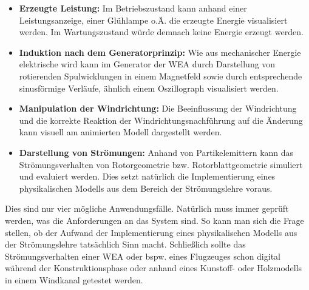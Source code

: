 \begin{itemize}
\item \textbf{Erzeugte Leistung:} Im Betriebszustand kann anhand einer Leistungsanzeige, einer Glühlampe o.Ä. die erzeugte Energie visualisiert werden. Im Wartungszustand würde demnach keine Energie erzeugt werden.
 
\item \textbf{Induktion nach dem Generatorprinzip:} Wie aus mechanischer Energie elektrische wird kann im Generator der WEA durch Darstellung von rotierenden Spulwicklungen in einem Magnetfeld sowie durch entsprechende sinusförmige Verläufe, ähnlich einem Oszillograph visualisiert werden.
 
\item \textbf{Manipulation der Windrichtung:} Die Beeinflussung der Windrichtung und die korrekte Reaktion der Windrichtungsnachführung auf die Änderung kann visuell am animierten Modell dargestellt werden.

\item \textbf{Darstellung von Strömungen:} Anhand von Partikelemittern kann das Strömungsverhalten von Rotorgeometrie bzw. Rotorblattgeometrie simuliert und evaluiert werden. Dies setzt natürlich die Implementierung eines physikalischen Modells aus dem Bereich der Strömungslehre voraus. 
 
\end{itemize} 

Dies sind nur vier mögliche Anwendungsfälle. Natürlich muss immer geprüft werden, was die Anforderungen an das System sind. So kann man sich die Frage stellen, ob der Aufwand der Implementierung eines physikalischen Modells aus der Strömungslehre tatsächlich Sinn macht. Schließlich sollte das Strömungsverhalten einer WEA oder bspw. eines Flugzeuges schon digital während der  Konstruktionsphase oder anhand eines Kunstoff- oder Holzmodells in einem Windkanal getestet werden. 
